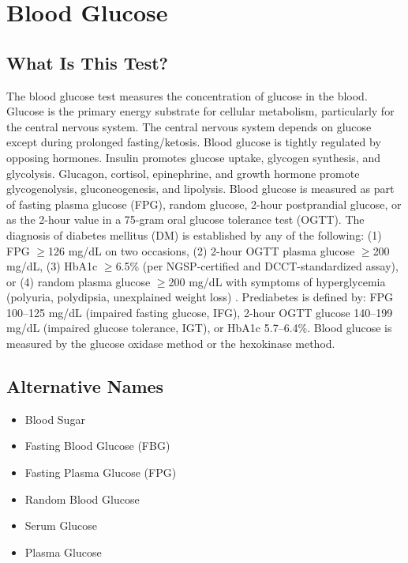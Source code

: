 \chapter{Blood Glucose}
\section*{What Is This Test?}
The blood glucose test measures the concentration of glucose in the blood. Glucose is the primary energy substrate for cellular metabolism, particularly for the central nervous system. The central nervous system depends on glucose except during prolonged fasting/ketosis. Blood glucose is tightly regulated by opposing hormones. Insulin promotes glucose uptake, glycogen synthesis, and glycolysis. Glucagon, cortisol, epinephrine, and growth hormone promote glycogenolysis, gluconeogenesis, and lipolysis. Blood glucose is measured as part of fasting plasma glucose (FPG), random glucose, 2-hour postprandial glucose, or as the 2-hour value in a 75-gram oral glucose tolerance test (OGTT). The diagnosis of diabetes mellitus (DM) is established by any of the following: (1) FPG $\geq$126 mg/dL on two occasions, (2) 2-hour OGTT plasma glucose $\geq$200 mg/dL, (3) HbA1c $\geq$6.5\% (per NGSP-certified and DCCT-standardized assay), or (4) random plasma glucose $\geq$200 mg/dL with symptoms of hyperglycemia (polyuria, polydipsia, unexplained weight loss) \cite{sacks2011guidelines}. Prediabetes is defined by: FPG 100--125 mg/dL (impaired fasting glucose, IFG), 2-hour OGTT glucose 140--199 mg/dL (impaired glucose tolerance, IGT), or HbA1c 5.7--6.4\%. Blood glucose is measured by the glucose oxidase method or the hexokinase method.
\section*{Alternative Names}
\begin{itemize}
  \item Blood Sugar
  \item Fasting Blood Glucose (FBG)
  \item Fasting Plasma Glucose (FPG)
  \item Random Blood Glucose
  \item Serum Glucose
  \item Plasma Glucose
\end{itemize}
